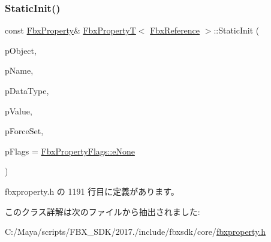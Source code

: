 \subsubsection{\texorpdfstring{Static\+Init()}{StaticInit()}\hspace{0.1cm}{\footnotesize\ttfamily [2/2]}}
{\footnotesize\ttfamily const \hyperlink{class_fbx_property}{Fbx\+Property}\& \hyperlink{class_fbx_property_t}{Fbx\+PropertyT}$<$ \hyperlink{fbxtypes_8h_a44df6a2eec915cf27cd481e5c5e48a24}{Fbx\+Reference} $>$\+::Static\+Init (\begin{DoxyParamCaption}\item[{\hyperlink{class_fbx_object}{Fbx\+Object} $\ast$}]{p\+Object,  }\item[{const char $\ast$}]{p\+Name,  }\item[{const \hyperlink{class_fbx_data_type}{Fbx\+Data\+Type} \&}]{p\+Data\+Type,  }\item[{const \hyperlink{fbxtypes_8h_a44df6a2eec915cf27cd481e5c5e48a24}{Fbx\+Reference} \&}]{p\+Value,  }\item[{bool}]{p\+Force\+Set,  }\item[{\hyperlink{class_fbx_property_flags_afabfa7e0949aac8a7dcdf8a141867e99}{Fbx\+Property\+Flags\+::\+E\+Flags}}]{p\+Flags = {\ttfamily \hyperlink{class_fbx_property_flags_afabfa7e0949aac8a7dcdf8a141867e99ac1b9aab93d40af76eb419be426de17b1}{Fbx\+Property\+Flags\+::e\+None}} }\end{DoxyParamCaption})\hspace{0.3cm}{\ttfamily [inline]}}



 fbxproperty.\+h の 1191 行目に定義があります。



このクラス詳解は次のファイルから抽出されました\+:\begin{DoxyCompactItemize}
\item 
C\+:/\+Maya/scripts/\+F\+B\+X\+\_\+\+S\+D\+K/2017./include/fbxsdk/core/\hyperlink{fbxproperty_8h}{fbxproperty.\+h}\end{DoxyCompactItemize}
